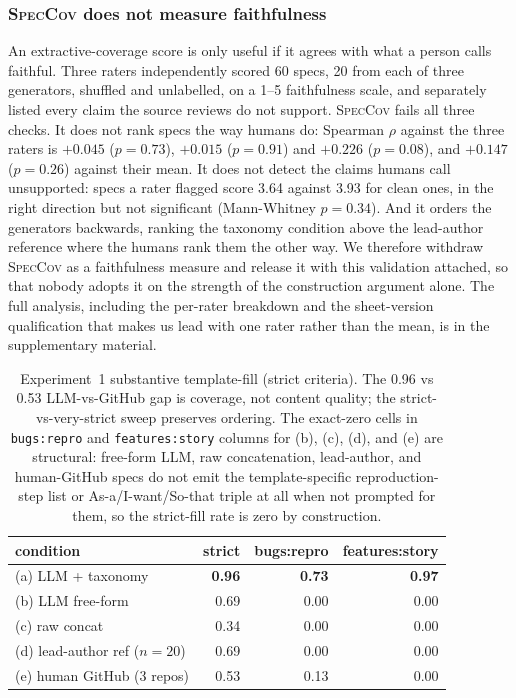 \documentclass[preprint,12pt]{elsarticle}
\begin{document}
\subsubsection*{\textsc{SpecCov} does not measure faithfulness}\label{speccov-validation}
An extractive-coverage score is only useful if it agrees with what a person calls faithful. Three
raters independently scored 60 specs, 20 from each of three generators, shuffled and unlabelled,
on a 1--5 faithfulness scale, and separately listed every claim the source reviews do not support.
\textsc{SpecCov} fails all three checks. It does not rank specs the way humans do: Spearman $\rho$
against the three raters is $+0.045$ ($p = 0.73$), $+0.015$ ($p = 0.91$) and $+0.226$ ($p = 0.08$),
and $+0.147$ ($p = 0.26$) against their mean. It does not detect the claims humans call
unsupported: specs a rater flagged score 3.64 against 3.93 for clean ones, in the right direction
but not significant (Mann-Whitney $p = 0.34$). And it orders the generators backwards, ranking the
taxonomy condition above the lead-author reference where the humans rank them the other way. We
therefore withdraw \textsc{SpecCov} as a faithfulness measure and release it with this validation
attached, so that nobody adopts it on the strength of the construction argument alone. The full
analysis, including the per-rater breakdown and the sheet-version qualification that makes us lead
with one rater rather than the mean, is in the supplementary material.

\begin{table}[t]\centering\footnotesize
  
  \begin{tabular}{lrrr}
  \toprule
  condition & strict & bugs:repro & features:story \\
  \midrule
  (a) LLM + taxonomy & \textbf{0.96} & \textbf{0.73} & \textbf{0.97} \\
  (b) LLM free-form & 0.69 & 0.00 & 0.00 \\
  (c) raw concat & 0.34 & 0.00 & 0.00 \\
  (d) lead-author ref ($n=20$) & 0.69 & 0.00 & 0.00 \\
  (e) human GitHub (3 repos) & 0.53 & 0.13 & 0.00 \\
  \bottomrule
  \end{tabular}
\caption{Experiment~1 substantive template-fill (strict criteria). The 0.96 vs 0.53
  LLM-vs-GitHub gap is coverage, not content quality; the strict-vs-very-strict sweep preserves
  ordering. The exact-zero cells in \texttt{bugs:repro} and \texttt{features:story} columns for
  (b), (c), (d), and (e) are structural: free-form LLM, raw concatenation, lead-author, and
  human-GitHub specs do not emit the template-specific reproduction-step list or
  As-a/I-want/So-that triple at all when not prompted for them, so the strict-fill rate is zero
  by construction.}\label{tab:stage3}
  \end{table}
\end{document}
